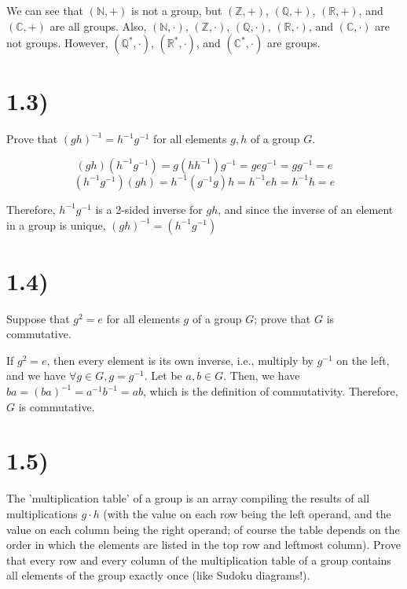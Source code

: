 We can see that $(\mathbb{N}, +)$ is not a group, but $(\mathbb{Z}, +)$, $(\mathbb{Q}, +)$, $(\mathbb{R}, +)$, and $(\mathbb{C}, +)$ are all groups. Also, $(\mathbb{N}, \cdot)$, $(\mathbb{Z}, \cdot)$, $(\mathbb{Q}, \cdot)$, $(\mathbb{R}, \cdot)$, and $(\mathbb{C}, \cdot)$ are not groups. However, $(\mathbb{Q}^*, \cdot)$, $(\mathbb{R}^*, \cdot)$, and $(\mathbb{C}^*, \cdot)$ are groups.



\section*{1.3)}

Prove that $(gh)^{-1} = h^{-1} g^{-1}$ for all elements $g, h$ of a group $G$.

$$(gh)(h^{-1}g^{-1}) = g(hh^{-1})g^{-1} = geg^{-1} = gg^{-1} = e$$
$$(h^{-1}g^{-1})(gh) = h^{-1}(g^{-1}g)h = h^{-1}eh = h^{-1}h = e$$

Therefore, $h^{-1} g^{-1}$ is a 2-sided inverse for $gh$, and since the inverse of an element in a group is unique, $(gh)^{-1} = (h^{-1}g^{-1})$



\section*{1.4)}

Suppose that $g^2 = e$ for all elements $g$ of a group $G$; prove that $G$ is commutative.

If $g^2 = e$, then every element is its own inverse, i.e., multiply by $g^{-1}$ on the left, and we have $\forall g \in G, g = g^{-1}$. Let be $a, b \in G$. Then, we have $ba = (ba)^{-1} = a^{-1}b^{-1} = ab$, which is the definition of commutativity. Therefore, $G$ is commutative.



\section*{1.5)}

The 'multiplication table' of a group is an array compiling the results of all multiplications $g \cdot h$ (with the value on each row being the left operand, and the value on each column being the right operand; of course the table depends on the order in which the elements are listed in the top row and leftmost column). Prove that every row and every column of the multiplication table of a group contains all elements of the group exactly once (like Sudoku diagrams!).

